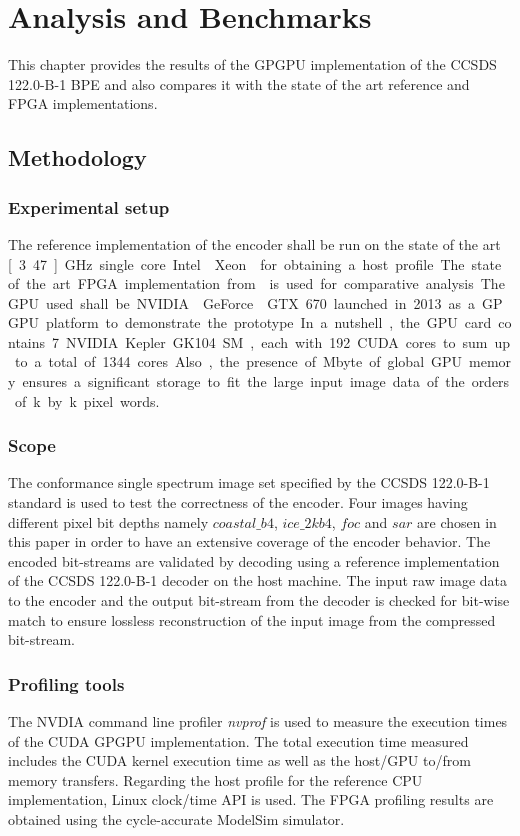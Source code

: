 \chapter{Analysis and Benchmarks\label{cha:chapter5}}
This chapter provides the results of the GPGPU implementation of the CCSDS 122.0-B-1 \gls{BPE} and also compares it with the state of the art reference and FPGA implementations.

\section{Methodology}

\subsection{Experimental setup}
The reference implementation of the encoder shall be run on the state of the art \unit[3.47]{GHz} single core Intel{\textregistered} Xeon{\texttrademark} for obtaining a host profile. The state of the art FPGA implementation from \cite{Manthey2014} is used for comparative analysis. The GPU used shall be NVIDIA{\textregistered} GeForce{\textregistered} GTX 670 launched in 2013 as a GPGPU platform to demonstrate the prototype. In a nutshell, the GPU card contains 7 NVIDIA Kepler GK104 \gls{SM}, each with 192 CUDA cores to sum up to a total of 1344 cores. Also, the presence of \unit[2048]{Mbyte} of global GPU memory ensures a significant storage to fit the large input image data of the orders of \unit[16]{k} by \unit[32]{k} pixel words.
\subsection{Scope}
The conformance single spectrum image set specified by the CCSDS 122.0-B-1 standard \cite{CCSDS122green} is used to test the correctness of the encoder. Four images having different pixel bit depths namely $coastal\_b4$, $ice\_2kb4$, $foc$ and $sar$ are chosen in this paper in order to have an extensive coverage of the encoder behavior. The encoded bit-streams are validated by decoding using a reference implementation of the CCSDS 122.0-B-1 decoder on the host machine. The input raw image data to the encoder and the output bit-stream from the decoder is checked for bit-wise match to ensure lossless reconstruction of the input image from the compressed bit-stream.
\subsection{Profiling tools}
The NVDIA command line profiler \textit{nvprof} is used to measure the execution times of the \gls{CUDA} \gls{GPGPU} implementation. The total execution time measured includes the \gls{CUDA} kernel execution time as well as the host/GPU to/from memory transfers. Regarding the host profile for the reference \gls{CPU} implementation, Linux clock/time API is used. The \gls{FPGA} profiling results are obtained using the cycle-accurate ModelSim{\texttrademark} simulator.
